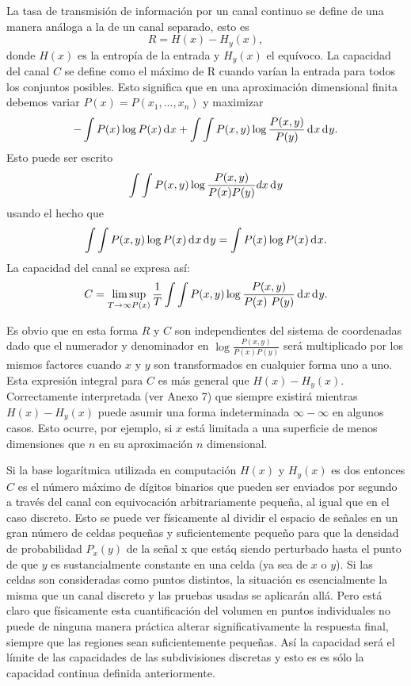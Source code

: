 La tasa de transmisi\'on de informaci\'on por un canal continuo se
define de una manera an\'aloga a la de un canal separado, esto
es 
\begin{equation} 
R = H(x) - H_{y}(x), 
\end{equation} 
donde $H(x)$ es la entrop\'ia de la entrada y $H_{y}(x)$ el
equ\'ivoco. La capacidad del canal $C$ se define como el m\'aximo de R
cuando var\'ian la entrada para todos los conjuntos posibles. Esto
significa que en una aproximaci\'on dimensional finita debemos variar
$P(x) = P(x_{1},...,x_{n})$ y maximizar 
\begin{equation} 
- \int P(x) \log P(x) \diff x 
+ \int\int P(x,y)\log \frac{P(x,y)}{P(y)} \diff x \diff y.  
\end{equation} 
Esto puede ser escrito 
\begin{equation} 
\int\int P(x,y) \log \frac{P(x,y)}{P(x)P(y)}dx \diff y
\end{equation} 
usando el hecho que
\begin{equation}
\int\int P(x,y)\log P(x) \diff x \diff y = 
\int P(x)\log P(x) \diff x.
\end{equation} 
La capacidad del canal se expresa as\'i:
\begin{equation}
C = \limsup_{T\to \infty P(x)} 
\frac{1}{T}
\int\int P(x,y)\log \frac{P(x,y)}{P(x)~P(y)} \diff x \diff y.
\end{equation}
	
Es obvio que en esta forma $R$ y $C$ son independientes del sistema de
coordenadas dado que el numerador y denominador en
$\log\frac{P(x,y)}{P(x)P(y)}$ ser\'a multiplicado por los mismos
factores cuando $x$ y $y$ son transformados en cualquier forma uno a
uno. Esta expresi\'on integral para $C$ es m\'{a}s general que
$H(x) - H_{y}(x)$. Correctamente interpretada (ver Anexo 7) que siempre
existir\'a mientras $H(x)-H_{y}(x)$ puede asumir una forma
indeterminada $\infty - \infty$ en algunos casos. Esto ocurre, por
ejemplo, si $x$ est\'a limitada a una superficie de menos dimensiones
que $n$ en su aproximaci\'on $n$ dimensional.
	
Si la base logar\'itmica utilizada en computaci\'on $H(x)$ y
$H_{y}(x)$ es dos entonces $C$ es el n\'umero m\'aximo de d\'igitos
binarios que pueden ser enviados por segundo a trav\'es del canal con
equivocaci\'on arbitrariamente peque\~na, al igual que en el caso
discreto. Esto se puede ver f\'isicamente al dividir el espacio de
se\~nales en un gran n\'umero de celdas peque\~nas y suficientemente
peque\~no para que la densidad de probabilidad $P_{x}(y)$ de la
se\~nal x que est\'{a}q siendo perturbado hasta el punto de que $y$ es
sustancialmente constante en una celda (ya sea de $x$ o $y$). Si las
celdas son consideradas como puntos distintos, la situaci\'on es
esencialmente la misma que un canal discreto y las pruebas usadas se
aplicar\'an all\'{a}. Pero est\'{a} claro que f\'isicamente esta
cuantificaci\'on del volumen en puntos individuales no puede de
ninguna manera pr\'actica alterar significativamente la respuesta
final, siempre que las regiones sean suficientemente peque\~nas. As\'i
la capacidad ser\'{a} el l\'imite de las capacidades de las
subdivisiones discretas y esto es es s\'olo la capacidad continua
definida anteriormente.
	
